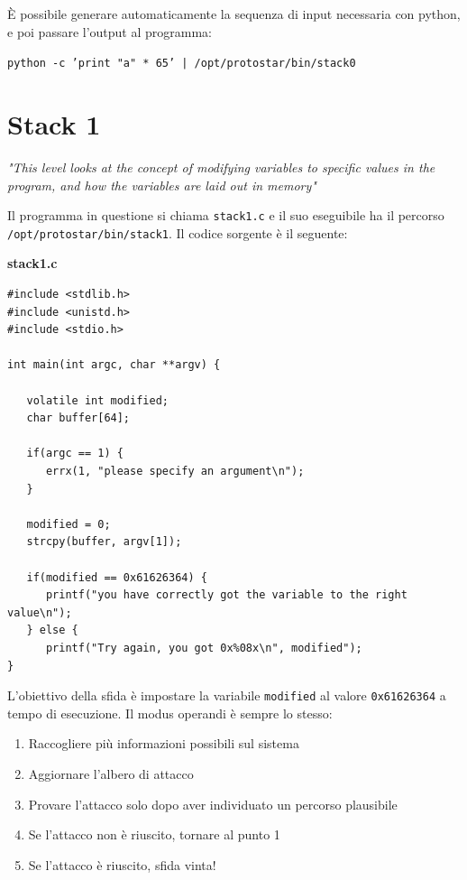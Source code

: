 È possibile generare automaticamente la sequenza di input necessaria con python, e poi passare l'output al programma:
\begin{center}
    \texttt{python -c 'print "a" * 65' |
/opt/protostar/bin/stack0}
\end{center}

\section{Stack 1}
\begin{center}
\textit{"This level looks at the concept of modifying
variables to specific values in the program,
and how the variables are laid out in memory"}
\end{center}
Il programma in questione si chiama \texttt{stack1.c} e il suo eseguibile ha il percorso \texttt{/opt/protostar/bin/stack1}. Il codice sorgente è il seguente:
\begin{mdframed}[backgroundcolor=white!20,shadow=false]
\textbf{stack1.c}
\begin{verbatim}
#include <stdlib.h>
#include <unistd.h>
#include <stdio.h>

int main(int argc, char **argv) {

   volatile int modified;
   char buffer[64];
   
   if(argc == 1) {
      errx(1, "please specify an argument\n");
   }
 
   modified = 0;
   strcpy(buffer, argv[1]);
 
   if(modified == 0x61626364) {
      printf("you have correctly got the variable to the right value\n");
   } else {
      printf("Try again, you got 0x%08x\n", modified");
}
\end{verbatim}
\end{mdframed}
L'obiettivo della sfida è impostare la variabile \texttt{modified} al valore \texttt{0x61626364} a tempo di esecuzione. Il modus operandi è sempre lo stesso:
\begin{enumerate}
    \item Raccogliere più informazioni possibili sul sistema
    \item Aggiornare l'albero di attacco
    \item Provare l'attacco solo dopo aver individuato un
percorso plausibile
    \item Se l'attacco non è riuscito, tornare al punto 1
    \item Se l'attacco è riuscito, sfida vinta! 
\end{enumerate}
